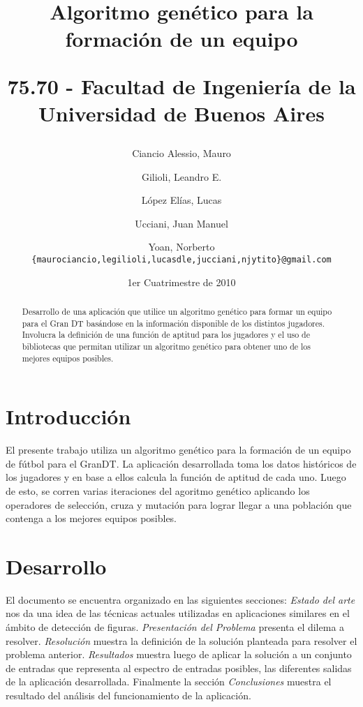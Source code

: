 \documentclass[pdftex,a4paper,10.5pt]{article}
\title{\textbf{Algoritmo gen\'etico para la formaci\'on de un equipo}\\
\begin{normalsize}75.70 - Facultad de Ingenier\'ia de la Universidad de Buenos Aires\end{normalsize} }
\author{
	Ciancio Alessio, Mauro \and
	Gilioli, Leandro E. \and
	L\'opez El\'ias, Lucas \and
	Ucciani, Juan Manuel \and
	Yoan, Norberto \\
	\texttt{\{maurociancio,legilioli,lucasdle,jucciani,njytito\}@gmail.com}
	}
\date{1er Cuatrimestre de 2010}
\begin{document}
\maketitle

\begin{abstract}
	Desarrollo de una aplicaci\'on que utilice un algoritmo gen\'etico para formar un equipo para el Gran DT bas\'andose en la informaci\'on disponible de los distintos jugadores. Involucra la definici\'on de una funci\'on de aptitud para los jugadores y el uso de bibliotecas que permitan utilizar un algoritmo gen\'etico para obtener uno de los mejores equipos posibles. 
\end{abstract}

\thispagestyle{empty}

\section{Introducci\'on}
El presente trabajo utiliza un algoritmo gen\'etico para la formaci\'on de un equipo de f\'utbol para el GranDT. La aplicaci\'on desarrollada toma los datos hist\'oricos de los jugadores y en base a ellos calcula la funci\'on de aptitud de cada uno. Luego de esto, se corren varias iteraciones del agoritmo gen\'etico aplicando los operadores de selecci\'on, cruza y mutaci\'on para lograr llegar a una poblaci\'on que contenga a los mejores equipos posibles.


\section{Desarrollo}
El documento se encuentra organizado en las siguientes secciones:
\textit{Estado del arte} nos da una idea de las t\'ecnicas actuales utilizadas en aplicaciones similares en el ámbito de detecci\'on de figuras. 
\textit{Presentaci\'on del Problema} presenta el dilema a resolver.
\textit{Resoluci\'on} muestra la definici\'on de la soluci\'on planteada para resolver el problema anterior. 
\textit{Resultados} muestra luego de aplicar la soluci\'on a un conjunto de entradas que representa al espectro de entradas posibles, las diferentes salidas de la aplicaci\'on desarrollada.
Finalmente la secci\'on \textit{Conclusiones} muestra el resultado del an\'alisis del funcionamiento de la aplicaci\'on.
\end{document}
